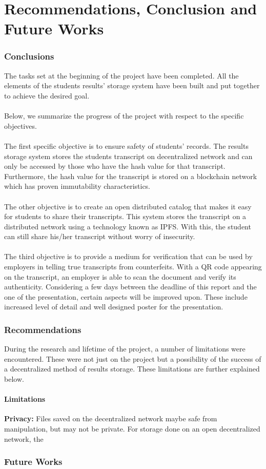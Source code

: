 \chapter{Recommendations, Conclusion and Future Works}

\subsection{Conclusions}
The tasks set at the beginning of the project have been completed. All the elements of the students results' storage system have been built and put together to achieve the desired goal.\\~\\
Below, we summarize the progress of the project with respect to the specific objectives.\\~\\
The first specific objective is to ensure safety of students' records. The results storage system stores the students transcript on decentralized network and can only be accessed by those who have the hash value for that transcript. Furthermore, the hash value for the transcript is stored on a blockchain network which has proven immutability characteristics.\\~\\
The other objective is to create an open distributed catalog that makes it easy for students to share their transcripts. This system stores the transcript on a distributed network using a technology known as IPFS. With this, the student can still share his/her transcript without worry of insecurity.\\~\\
The third objective is to provide a medium for verification that can be used by employers in telling true transcripts from counterfeits. With a QR code appearing on the transcript, an employer is able to scan the document and verify its authenticity. Considering a few days between the deadline of this report and the one of the presentation, certain aspects will be improved upon. These include increased level of detail and well designed poster for the presentation.

\subsection{Recommendations}
During the research and lifetime of the project, a number of limitations were encountered. These were not just on the project but a possibility of the success of a decentralized method of results storage. These limitations are further explained below.

\subsubsection{Limitations}
\textbf{Privacy:} Files saved on the decentralized network maybe safe from manipulation, but may not be private. For storage done on an open decentralized network, the 

\subsection{Future Works}